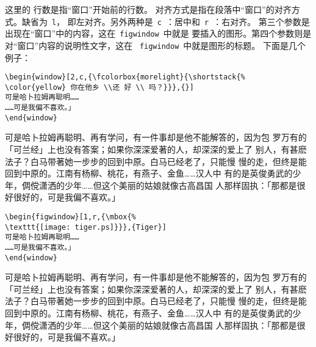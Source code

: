
\noindent 这里的{ 行数}是指``窗口''开始前的行数。
{ 对齐方式}是指在段落中``窗口''的对齐方式。缺省为~\texttt{l}，
即左对齐。另外两种是~\texttt{c}~：居中和~\texttt{r}~：右对齐。
第三个参数是出现在``窗口''中的内容，这在~\texttt{figwindow}~中就是
要插入的图形。第四个参数则是对``窗口''内容的说明性文字，这在
~\texttt{figwindow}~中就是图形的标题。
下面是几个例子：

\begin{Verbatim}
\begin{window}[2,c,{\fcolorbox{morelight}{\shortstack{%
\color{yellow} 你在他乡 \\还 好 \\ 吗？}}},{}]
可是哈卜拉姆再聪明……
……可是我偏不喜欢。」
\end{window}
\end{Verbatim}

\begin{window}
	可是哈卜拉姆再聪明、再有学问，有一件事却是他不能解答的，因为包
	罗万有的「可兰经」上也没有答案；如果你深深爱著的人，却深深的爱上了
	别人，有甚麽法子？白马带著她一步步的回到中原。白马已经老了，只能慢
	慢的走，但终是能回到中原的。江南有杨柳、桃花，有燕子、金鱼……汉人中
	有的是英俊勇武的少年，倜傥潇洒的少年……但这个美丽的姑娘就像古高昌国
	人那样固执：「那都是很好很好的，可是我偏不喜欢。」
\end{window}

\begin{Verbatim}
\begin{figwindow}[1,r,{\mbox{%
\texttt{[image: tiger.ps]}}},{Tiger}]
可是哈卜拉姆再聪明……
……可是我偏不喜欢。」
\end{window}
\end{Verbatim}

\begin{figwindow}
	可是哈卜拉姆再聪明、再有学问，有一件事却是他不能解答的，因为包
	罗万有的「可兰经」上也没有答案；如果你深深爱著的人，却深深的爱上了
	别人，有甚麽法子？白马带著她一步步的回到中原。白马已经老了，只能慢
	慢的走，但终是能回到中原的。江南有杨柳、桃花，有燕子、金鱼……汉人中
	有的是英俊勇武的少年，倜傥潇洒的少年……但这个美丽的姑娘就像古高昌国
	人那样固执：「那都是很好很好的，可是我偏不喜欢。」
\end{figwindow}

